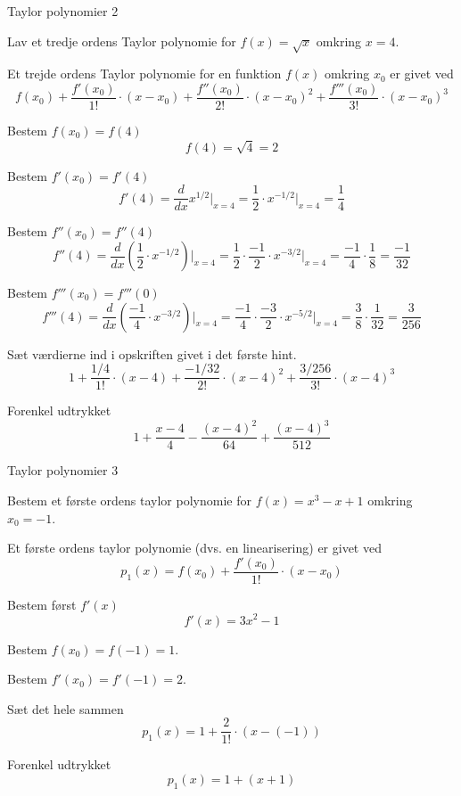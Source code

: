 \documentclass{article}
\begin{document}
\begin{exercise}{Taylor polynomier 2}

Lav et tredje ordens Taylor polynomie for $f(x) = \sqrt{x}$
omkring $x = 4$.


\hint
Et trejde ordens Taylor polynomie for en funktion $f(x)$
omkring $x_0$ er givet ved
\[
f(x_0) + \frac{f'(x_0)}{1!} \cdot (x - x_0) + \frac{f''(x_0)}{2!} \cdot (x - x_0)^2 + \frac{f'''(x_0)}{3!} \cdot (x - x_0)^3
\]

\hint
Bestem $f(x_0) = f(4)$
\[
f(4) = \sqrt{4} = 2
\]

\hint
Bestem $f'(x_0) = f'(4)$
\[
f'(4) = \frac{d}{dx} x^{1/2} \Big|_{x = 4} = \frac{1}{2} \cdot x^{-1/2} \Big|_{x = 4} = \frac{1}{4}
\]

\hint
Bestem $f''(x_0) = f''(4)$
\[
f''(4) = \frac{d}{dx} \left( \frac{1}{2} \cdot x^{-1/2} \right) \Big|_{x = 4} = \frac{1}{2} \cdot \frac{-1}{2} \cdot x^{-3/2} \Big|_{x = 4} = \frac{-1}{4} \cdot \frac{1}{8} = \frac{-1}{32}
\]

\hint
Bestem $f'''(x_0) = f'''(0)$
\[
f'''(4) = \frac{d}{dx} \left( \frac{-1}{4} \cdot x^{-3/2} \right) \Big|_{x = 4} = \frac{-1}{4} \cdot \frac{-3}{2} \cdot x^{-5/2} \Big|_{x = 4} = \frac{3}{8} \cdot \frac{1}{32} = \frac{3}{256} 
\]

\hint
Sæt værdierne ind i opskriften givet i det første hint.
\[
1 + \frac{1/4}{1!} \cdot (x - 4) + \frac{-1 / 32}{2!} \cdot (x - 4)^2 + \frac{3 / 256}{3!}  \cdot (x - 4)^3
\]

\hint
Forenkel udtrykket
\[
1 + \frac{x - 4}{4} - \frac{(x - 4)^2}{64} + \frac{(x - 4)^3}{512}
\]

\end{exercise}

\begin{exercise}{Taylor polynomier 3}

Bestem et første ordens taylor polynomie for $f(x) = x^3 - x + 1$
omkring $x_0 = -1$.


\hint
Et første ordens taylor polynomie (dvs. en linearisering) 
er givet ved
\[
p_1(x) = f(x_0) + \frac{f'(x_0)}{1!} \cdot (x - x_0)
\]


\hint
Bestem først $f'(x)$
\[
f'(x) = 3x^2 - 1
\]

\hint
Bestem $f(x_0) = f(-1) = 1$.

\hint
Bestem $f'(x_0) = f'(-1) = 2$.

\hint
Sæt det hele sammen
\[
p_1(x) = 1 + \frac{2}{1!} \cdot \left(x - (-1)\right)
\]

\hint
Forenkel udtrykket
\[
p_1(x) = 1 + (x + 1)
\]


\end{exercise}
\end{document}
